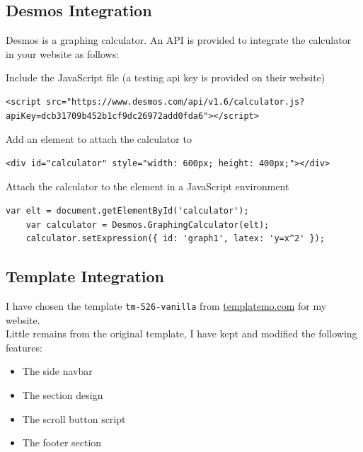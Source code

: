 \documentclass{article}
\begin{document}
\pagebreak

\subsection{Desmos Integration}

Desmos is a graphing calculator. An API\cite{desmos} is provided to integrate the calculator in your website as follows:


Include the JavaScript file (a testing api key is provided on their website)

\begin{lstlisting}[style=html]
    <script src="https://www.desmos.com/api/v1.6/calculator.js?apiKey=dcb31709b452b1cf9dc26972add0fda6"></script>
\end{lstlisting}

Add an element to attach the calculator to

\begin{lstlisting}[style=html]
    <div id="calculator" style="width: 600px; height: 400px;"></div>
\end{lstlisting}

Attach the calculator to the element in a JavaScript environment

\begin{lstlisting}[style=js]
    var elt = document.getElementById('calculator');
    var calculator = Desmos.GraphingCalculator(elt);
    calculator.setExpression({ id: 'graph1', latex: 'y=x^2' });
\end{lstlisting}

\subsection{Template Integration}

I have chosen the template \texttt{tm-526-vanilla} from \href{https://templatemo.com}{templatemo.com}\cite{templatemo} for my website. \\
Little remains from the original template, I have kept and modified the following features:

\begin{itemize}
    \item The side navbar
    \item The section design
    \item The scroll button script
    \item The footer section
\end{itemize}

\pagebreak
\end{document}
